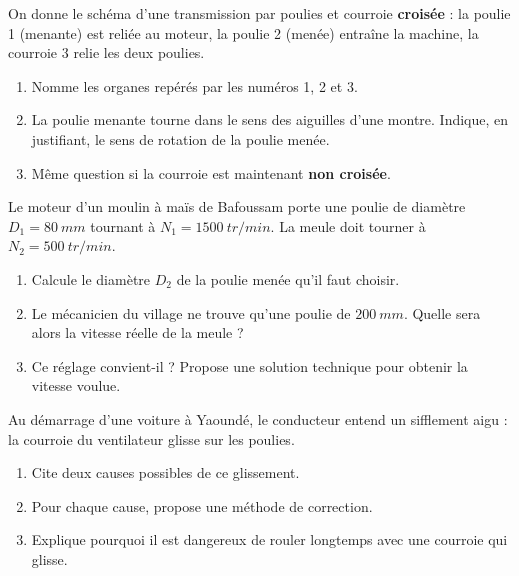 \documentclass[11pt]{article}
\newcommand{\cle}[1]{{\popxbold\color{popdark}#1}}
\newcounter{popsec}
\newcounter{popsub}
\newcommand{\courssub}[1]{%
  \stepcounter{popsub}%
  \par\vspace{9pt}\noindent{\popxbold\fontsize{11.5}{13}\selectfont\color{popink}{\color{poporange}\thepopsec.\thepopsub}\hspace{6pt}#1}\par\nopagebreak\vspace{4pt}
}
\begin{document}
\courssub{Je m'entraîne}

\begin{exercice}
On donne le schéma d'une transmission par poulies et courroie \textbf{croisée} : la poulie 1 (menante) est reliée au moteur, la poulie 2 (menée) entraîne la machine, la courroie 3 relie les deux poulies.
\begin{enumerate}
\item Nomme les organes repérés par les numéros 1, 2 et 3.
\item La poulie menante tourne dans le sens des aiguilles d'une montre. Indique, en justifiant, le sens de rotation de la poulie menée.
\item Même question si la courroie est maintenant \textbf{non croisée}.
\end{enumerate}
\end{exercice}

\begin{exercice}
Le moteur d'un moulin à maïs de Bafoussam porte une poulie de diamètre $D_1 = \SI{80}{mm}$ tournant à $N_1 = \SI{1500}{tr/min}$. La meule doit tourner à $N_2 = \SI{500}{tr/min}$.
\begin{enumerate}
\item Calcule le diamètre $D_2$ de la poulie menée qu'il faut choisir.
\item Le mécanicien du village ne trouve qu'une poulie de $\SI{200}{mm}$. Quelle sera alors la vitesse réelle de la meule ?
\item Ce réglage convient-il ? Propose une solution technique pour obtenir la vitesse voulue.
\end{enumerate}
\end{exercice}

\begin{exercice}
Au démarrage d'une voiture à Yaoundé, le conducteur entend un sifflement aigu : la courroie du ventilateur \cle{glisse} sur les poulies.
\begin{enumerate}
\item Cite deux causes possibles de ce glissement.
\item Pour chaque cause, propose une méthode de correction.
\item Explique pourquoi il est dangereux de rouler longtemps avec une courroie qui glisse.
\end{enumerate}
\end{exercice}
\end{document}

